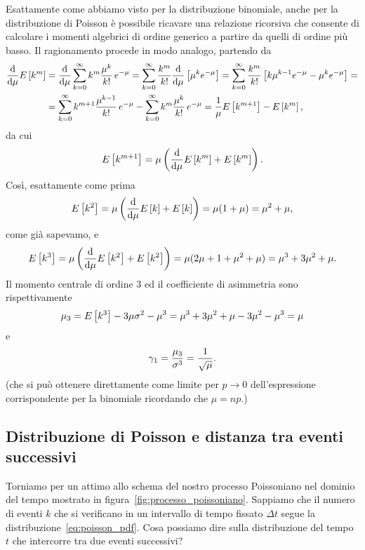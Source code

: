 \danger%
Esattamente come abbiamo visto per la distribuzione binomiale, anche per la
distribuzione di Poisson è possibile ricavare una relazione ricorsiva
che consente di calcolare i momenti algebrici di ordine generico a partire
da quelli di ordine più basso. Il ragionamento procede in modo analogo,
partendo da
\begin{align*}
  \td{}{\mu}{}\expect{k^m} & =
  \td{}{\mu}{} \sum_{k = 0}^\infty k^m \frac{\mu^k}{k!}\,e^{-\mu} =
  \sum_{k = 0}^\infty \frac{k^m}{k!} \td{}{\mu}{} \left[ \mu^k e^{-\mu} \right] =
  \sum_{k = 0}^\infty \frac{k^m}{k!}\left[ k\mu^{k-1}e^{-\mu} -
    \mu^k e^{-\mu}\right] = \\
  & = \sum_{k = 0}^\infty  k^{m+1} \frac{\mu^{k-1}}{k!}\,e^{-\mu} -
  \sum_{k = 0}^\infty k^m \frac{\mu^k}{k!}\,e^{-\mu} =
  \frac{1}{\mu}\expect{k^{m+1}} - \expect{k^m},
\end{align*}
da cui
\begin{align}
  \expect{k^{m+1}} = \mu\left( \td{}{\mu}{}\expect{k^m} + \expect{k^m} \right).
\end{align}
Così, esattamente come prima
\begin{align*}
  \expect{k^2} = \mu\left( \td{}{\mu}{}\expect{k} + \expect{k} \right) =
  \mu(1 + \mu) = \mu^2 + \mu,
\end{align*}
come già sapevamo, e
\begin{align*}
  \expect{k^3} = \mu\left( \td{}{\mu}{}\expect{k^2} + \expect{k^2} \right) =
  \mu(2\mu + 1 + \mu^2 + \mu) = \mu^3 + 3\mu^2 + \mu.
\end{align*}
Il momento centrale di ordine $3$ ed il coefficiente di asimmetria sono
rispettivamente
\begin{align*}
  \displaystyle \mu_{3} = \displaystyle E\left[k^3\right] - 3\mu\sigma^2 - \mu^3 =
  \mu^3 + 3\mu^2 + \mu - 3\mu^2 - \mu^3 = \mu
\end{align*}
e
\begin{align}\label{eq:poisson_asimmetria}
  \displaystyle \gamma_1 = \frac{\displaystyle \mu_{3}}{\sigma^3} = \frac{1}{\sqrt{\mu}}.
\end{align}
(che si può ottenere direttamente come limite per $p \rightarrow 0$
dell'espressione corrispondente per la binomiale ricordando che $\mu = np$.)


\subsection{Distribuzione di Poisson e distanza tra eventi successivi}
\label{sec:distanza_eventi_poisson}

Torniamo per un attimo allo schema del nostro processo Poissoniano nel dominio
del tempo mostrato in figura~\ref{fig:processo_poissoniano}. Sappiamo che
il numero di eventi $k$ che si verificano in un intervallo di tempo fissato
$\Delta t$ segue la distribuzione~\eqref{eq:poisson_pdf}. Cosa possiamo dire
sulla distribuzione del tempo $t$ che intercorre tra due eventi successivi?

